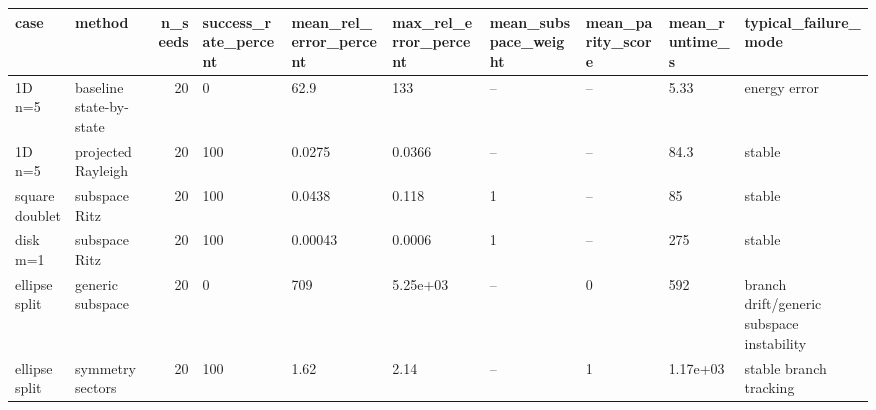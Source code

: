 \begin{tabular}{llrlllllll}
\toprule
case & method & n_seeds & success_rate_percent & mean_rel_error_percent & max_rel_error_percent & mean_subspace_weight & mean_parity_score & mean_runtime_s & typical_failure_mode \\
\midrule
1D n=5 & baseline state-by-state & 20 & 0 & 62.9 & 133 & -- & -- & 5.33 & energy error \\
1D n=5 & projected Rayleigh & 20 & 100 & 0.0275 & 0.0366 & -- & -- & 84.3 & stable \\
square doublet & subspace Ritz & 20 & 100 & 0.0438 & 0.118 & 1 & -- & 85 & stable \\
disk m=1 & subspace Ritz & 20 & 100 & 0.00043 & 0.0006 & 1 & -- & 275 & stable \\
ellipse split & generic subspace & 20 & 0 & 709 & 5.25e+03 & -- & 0 & 592 & branch drift/generic subspace instability \\
ellipse split & symmetry sectors & 20 & 100 & 1.62 & 2.14 & -- & 1 & 1.17e+03 & stable branch tracking \\
\bottomrule
\end{tabular}
